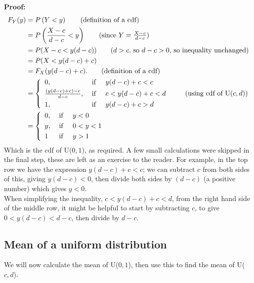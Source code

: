 \noindent \textbf{Proof:} \\
\begin{align*}
F_Y(y) & = P\brac{Y < y} \tag{definition of a cdf} \\
	  & = P\brac{\frac{X - c}{d - c} < y} \tag{since $Y = \frac{X - c}{d - c}$} \\
	  & = P(X - c < y(d-c)) \tag{$d > c$, so $d-c > 0$, so inequality unchanged} \\
	  & = P(X < y(d-c) + c) \\
	  & = F_X(y(d-c) + c). \tag{definition of a cdf} \\
	  & = \left\{ \begin{array}{ll}
	   			 0, & \; \text{if} \;\;\;\;\; y(d-c) + c < c \smallskip \\
	  			 \frac{(y(d-c) + c) - c}{d - c}, & \; \text{if} \;\;\;\;\; c < y(d-c) + c < d \smallskip \\
	  			 1, & \; \text{if} \;\;\;\;\; y(d-c) + c > d
	  \end{array}\right. \tag{using cdf of U($c,d$)} \\
	  & = \left\{ \begin{array}{ll}
	   			0, & \; \text{if} \;\;\;\;\; y < 0 \smallskip \\
	  			y, & \; \text{if} \;\;\;\;\; 0< y < 1 \smallskip \\
	  			1 & \; \text{if} \;\;\;\;\; y > 1
	  \end{array}\right.
\end{align*}
Which is the cdf of U($0,1$), as required. A few small calculations were skipped in the final step, these are left as an exercise to the reader. For example, in the top row we have the expression $y(d-c) + c < c$; we can subtract $c$ from both sides of this, giving $y(d-c) < 0$, then divide both sides by $(d-c)$ (a positive number) which gives $y < 0$. \\

\noindent When simplifying the inequality, $c < y(d-c) + c < d$, from the right hand side of the middle row, it might be helpful to start by subtracting $c$, to give $0 < y(d-c) < d - c$, then divide by $d-c$.
\subsection{Mean of a uniform distribution} \label{sec23.11}
We will now calculate the mean of U($0,1$), then use this to find the mean of U($c,d$). \\

